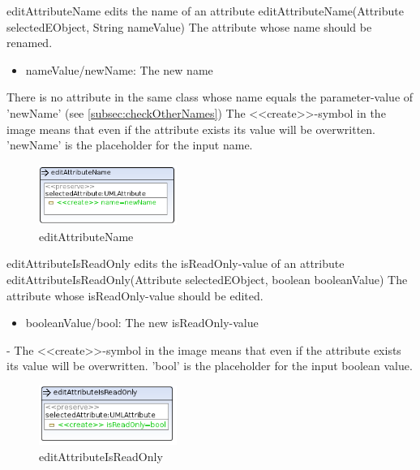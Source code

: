 \op
{editAttributeName}
{edits the name of an attribute}
{editAttributeName(Attribute selectedEObject, String nameValue)}
{The attribute whose name should be renamed.}
{
\begin{itemize}
 \item nameValue/newName: The new name
\end{itemize}
}
{There is no attribute in the same class whose name equals the parameter-value of
'newName' (see
\ref{subsec:checkOtherNames})}
{The \textless\textless create\textgreater\textgreater  -symbol in the image
means that even if the attribute exists its value will be overwritten.
'newName' is the placeholder for the input name.}
\begin{figure}[H]
  \centering
  \includegraphics[width=0.4\textwidth]{pics/editAttributeName.png}    
  \caption{editAttributeName}
  \label{editAttributeName}  
\end{figure}
\op
{editAttributeIsReadOnly}
{edits the isReadOnly-value of an attribute}
{editAttributeIsReadOnly(Attribute selectedEObject, boolean booleanValue)}
{The attribute whose isReadOnly-value should be edited.}
{
\begin{itemize}
 \item booleanValue/bool: The new isReadOnly-value
\end{itemize}
}
{-}
{The \textless\textless create\textgreater\textgreater  -symbol in the image
means that even if the attribute exists its value will be overwritten.
'bool' is the placeholder for the input boolean value.}
\begin{figure}[H]
  \centering
  \includegraphics[width=0.4\textwidth]{pics/editAttributeIsReadOnly.png}    
  \caption{editAttributeIsReadOnly}
  \label{editAttributeIsReadOnly}  
\end{figure}
